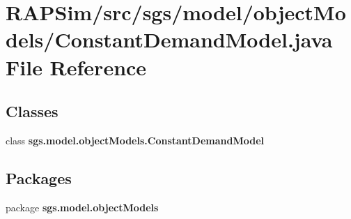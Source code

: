 \section{R\-A\-P\-Sim/src/sgs/model/object\-Models/\-Constant\-Demand\-Model.java File Reference}
\label{_constant_demand_model_8java}
\subsection*{Classes}
\begin{DoxyCompactItemize}
\item 
class {\bf sgs.\-model.\-object\-Models.\-Constant\-Demand\-Model}
\end{DoxyCompactItemize}
\subsection*{Packages}
\begin{DoxyCompactItemize}
\item 
package {\bf sgs.\-model.\-object\-Models}
\end{DoxyCompactItemize}
